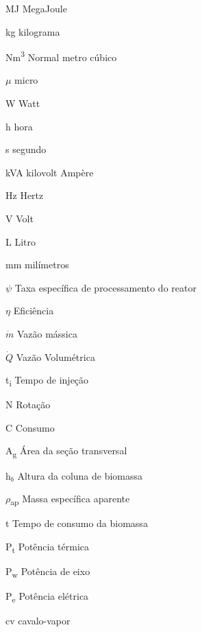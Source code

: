 \begin{simbolos}
	\item[MJ] MegaJoule
	\item[kg] kilograma
	\item[Nm\textsuperscript{3}] Normal metro cúbico
 	\item[$\mu$] micro
	\item[W] Watt
	\item[h] hora
	\item[s] segundo
	\item[kVA] kilovolt Ampère
	\item[Hz] Hertz
	\item[V] Volt
	\item[L] Litro
	\item[mm] milímetros
	\item[$\psi$] Taxa específica de processamento do reator
	\item[$\eta$] Eficiência
	\item[$\dot{m}$] Vazão mássica
	\item[$\dot{Q}$] Vazão Volumétrica
	\item[t\textsubscript{i}] Tempo de injeção
	\item[N] Rotação
	\item[C] Consumo
	\item[A\textsubscript{g}] Área da seção transversal
	\item[h$_b$] Altura da coluna de biomassa
	\item[$\rho$\textsubscript{ap}]	Massa específica aparente
	\item[t] Tempo de consumo da biomassa
	\item[P\textsubscript{t}] Potência térmica
	\item[P\textsubscript{w}] Potência de eixo
	\item[P\textsubscript{e}] Potência elétrica
	\item[cv] cavalo-vapor


\end{simbolos}
